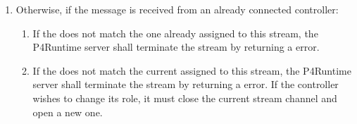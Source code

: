\documentclass[11pt]{article}
\begin{document}
{\begin{enumerate}
\begin{enumerate}
\item{}
Otherwise, the controller is added to a list of connected controllers for
the given (, ) and the server remembers the
controllers ,  and  for this gRPC
channel. See below for the rules to determine if this controller becomes
a primary or backup, and what notifications are sent as a consequence.%
\end{enumerate}%

\item{}
Otherwise, if the  message is received from an
already connected controller:%

\begin{enumerate}%

\item{}
If the  does not match the one already assigned to this
stream, the P4Runtime server shall terminate the stream by returning a
 error.%

\item{}
If the  does not match the current  assigned to this
stream, the P4Runtime server shall terminate the stream by returning a
 error. If the controller wishes to change its role,
it must close the current stream channel and open a new one.%


\end{enumerate}
\end{enumerate}}
\end{document}
